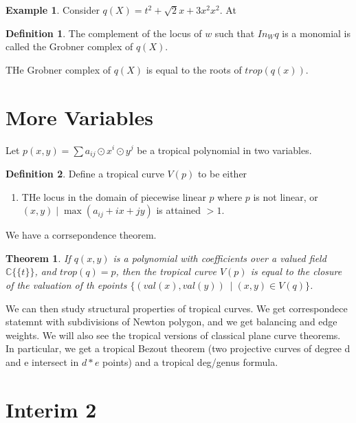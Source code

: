 \documentclass[12pt]{memoir}
\newtheorem{prototheorem}{Theorem}[section]
\newenvironment{theorem}
   {\begin{prototheorem}}
   {\end{prototheorem}}
\theoremstyle{definition}
\newtheorem{protoexample}{Example}[section]
\newenvironment{ex}
   {\begin{protoexample}}
   {\end{protoexample}}
\newtheorem{protodefinition}{Definition}[section]
\newenvironment{define}
   {\begin{protodefinition}}
   {\end{protodefinition}}
\def\CC{{\mathbb C}}
\begin{document}
\begin{ex}
    Consider $q(X) = t^2 + \sqrt{2}x + 3x^2x^2$. At 
\end{ex}




\begin{define}
    The complement of the locus of $w$ such that $In_W q$ is a monomial is called the Grobner complex of $q(X)$.
\end{define}



THe Grobner complex of $q(X)$ is equal to the roots of $trop(q(x))$.



\section{More Variables}


Let $p(x,y)= \sum a_{ij} \odot x^i\odot y^j$ be a tropical polynomial in two variables. 

\begin{define}
    Define a tropical curve $V(p)$ to be either
    \begin{enumerate}
        \item THe locus in the domain of piecewise linear $p$ where $p$ is not linear, or
        $(x,y)\; |\; \max(a_{ij} +ix+jy)$ is attained $>1$.
    \end{enumerate}
\end{define}

We have a corrsepondence theorem.

\begin{theorem}
    If $q(x,y)$ is a polynomial with coefficients over a valued field $\CC\{\{t\}\}$, and $trop (q) = p$, then the tropical curve $V(p)$ is equal to the closure of the valuation of th epoints $\{(val(x), val(y)) \:\; |\; (x,y) \in V(q)\}$.
\end{theorem}



We can then study structural properties of tropical curves. We get correspondece statemnt with subdivisions of Newton polygon, and we get balancing and edge weights.  We will also see the tropical versions of classical plane curve theorems. In particular, we get a tropical Bezout theorem (two projective curves of degree d and e intersect in $d*e$ points) and a tropical deg/genus formula.




\section{Interim 2}
\end{document}
